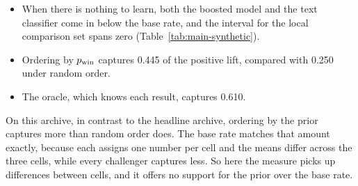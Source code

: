 \begin{itemize}
\item When there is nothing to learn, both the boosted model and the text classifier come in below the base rate, and the interval for the local comparison set spans zero (Table~\ref{tab:main-synthetic}).
\item Ordering by $p_{\mathrm{win}}$ captures 0.445 of the positive lift, compared with 0.250 under random order.
\item The oracle, which knows each result, captures 0.610.
\end{itemize}
On this archive, in contrast to the headline archive, ordering by the prior captures more than random order does. The base rate matches that amount exactly, because each assigns one number per cell and the means differ across the three cells, while every challenger captures less. So here the measure picks up differences between cells, and it offers no support for the prior over the base rate.

